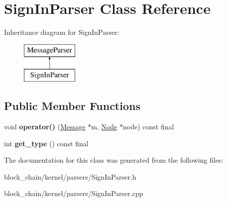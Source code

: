\hypertarget{classSignInParser}{}\section{Sign\+In\+Parser Class Reference}
\label{classSignInParser}
Inheritance diagram for Sign\+In\+Parser\+:\begin{figure}[H]
\begin{center}
\leavevmode
\includegraphics[height=2.000000cm]{classSignInParser}
\end{center}
\end{figure}
\subsection*{Public Member Functions}
\begin{DoxyCompactItemize}
\item 
\mbox{\label{classSignInParser_aa73b5113c2c03361469149c456ef9cc0}} 
void {\bfseries operator()} (\mbox{\hyperlink{classMessage}{Message}} $\ast$m, \mbox{\hyperlink{classNode}{Node}} $\ast$node) const final
\item 
\mbox{\label{classSignInParser_a30af4fa4b99e704e48848aab284d6a24}} 
int {\bfseries get\+\_\+type} () const final
\end{DoxyCompactItemize}


The documentation for this class was generated from the following files\+:\begin{DoxyCompactItemize}
\item 
block\+\_\+chain/kernel/parsers/Sign\+In\+Parser.\+h\item 
block\+\_\+chain/kernel/parsers/Sign\+In\+Parser.\+cpp\end{DoxyCompactItemize}
